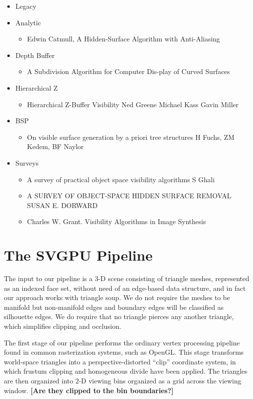 \documentclass[review]{acmsiggraph}
\begin{document}
\begin{itemize}
\item Legacy 
\item Analytic
\begin{itemize}
\item Edwin Catmull, A Hidden-Surface Algorithm with Anti-Aliasing
\end{itemize}
\item Depth Buffer
\begin{itemize}
\item A Subdivision Algorithm for Computer Dis-play of Curved Surfaces
\end{itemize}
\item Hierarchical Z
\begin{itemize}
\item Hierarchical Z-Buffer Visibility Ned Greene Michael Kass Gavin Miller
\end{itemize}
\item BSP
\begin{itemize}
\item On visible surface generation by a priori tree structures H Fuchs, ZM Kedem, BF Naylor
\end{itemize}
\item Surveys
\begin{itemize}
\item A survey of practical object space visibility algorithms  S Ghali
\item A SURVEY OF OBJECT-SPACE HIDDEN SURFACE REMOVAL SUSAN E. DORWARD
\item Charles W. Grant. Visibility Algorithms in Image Synthesis
\end{itemize}
\end{itemize}

\section{The SVGPU Pipeline}

The input to our pipeline is a 3-D scene consisting of triangle meshes,
represented as an indexed face set, without need of an edge-based data
structure, and in fact our approach works with triangle soup. We do not require
the meshes to be manifold but non-manifold edges and boundary edges will be
classified as silhouette edges.  We do require that no triangle pierces any
another triangle, which simplifies clipping and occlusion.

The first stage of our pipeline performs the ordinary vertex processing
pipeline found in common rasterization systems, such as OpenGL. This stage
transforms world-space triangles into a perspective-distorted ``clip''
coordinate system, in which frustum clipping and homogeneous divide have been
applied. The triangles are then organized into 2-D viewing bins organized as a
grid across the viewing window. {\bf [Are they clipped to the bin boundaries?]}
\end{document}
